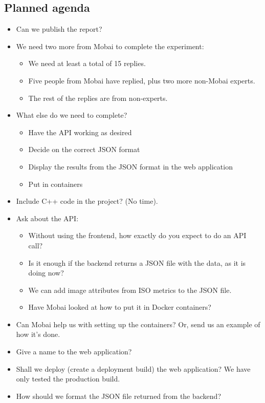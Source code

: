 \subsection*{Planned agenda}
\begin{itemize}
    \item Can we publish the report?
    \item We need two more from Mobai to complete the experiment: 
    \begin{itemize}
        \item We need at least a total of 15 replies. 
        \item Five people from Mobai have replied, plus two more non-Mobai experts.
        \item The rest of the replies are from non-experts.
    \end{itemize}
    \item What else do we need to complete?
    \begin{itemize}
        \item Have the API working as desired
        \item Decide on the correct JSON format
        \item Display the results from the JSON format in the web application
        \item Put in containers
    \end{itemize}
\item Include C++ code in the project? (No time).
\item Ask about the API: 
    \begin{itemize}
        \item Without using the frontend, how exactly do you expect to do an API call?
        \item Is it enough if the backend returns a JSON file with the data, as it is doing now?
        \item We can add image attributes from ISO metrics to the JSON file.
        \item Have Mobai looked at how to put it in Docker containers?
    \end{itemize}
    \item Can Mobai help us with setting up the containers? Or, send us an example of how it’s done.
    \item Give a name to the web application?
    \item Shall we deploy (create a deployment build) the web application? We have only tested the production build.
    \item How should we format the JSON file returned from the backend?

\end{itemize}

